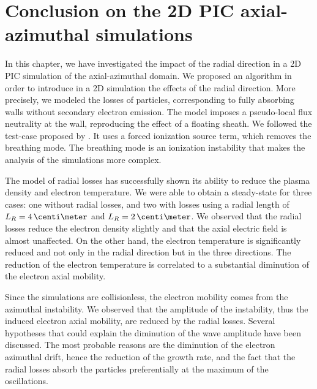 


\section{Conclusion on the 2D PIC axial-azimuthal simulations}

In this chapter, we have investigated the impact of the radial direction in a \ac{2D} \ac{PIC} simulation of the axial-azimuthal domain.
We proposed an algorithm in order to introduce in a \ac{2D} \ztheta simulation the effects of the radial direction.
More precisely, we modeled the losses of particles, corresponding to fully absorbing walls without secondary electron emission.
The model imposes a pseudo-local flux neutrality at the wall, reproducing the effect of a floating sheath.
We followed the test-case proposed by \citet{boeuf2018}.
It uses a forced ionization source term, which removes the breathing mode.
The breathing mode is an ionization instability that makes the analysis of the simulations more complex.

The model of radial losses has successfully shown its ability to reduce the plasma density and electron temperature.
We were able to obtain a steady-state for three cases\string: one without radial losses, and two with losses using a radial length of $L_R=4\,\centi\meter$ and $L_R=2\,\centi\meter$.
We observed that the radial losses reduce the electron density slightly and that the axial electric field is almost unaffected.
On the other hand, the electron temperature is significantly reduced and not only in the radial direction but in the three directions.
The reduction of the electron temperature is correlated to a substantial diminution of the electron axial mobility.

Since the simulations are collisionless, the electron mobility comes from the azimuthal instability.
We observed that the amplitude of the instability, thus the induced electron axial mobility, are reduced by the radial losses.
Several hypotheses that could explain the diminution of the wave amplitude have been discussed.
The most probable reasons are the diminution of the electron azimuthal drift, hence the reduction of the growth rate, and the fact that the radial losses absorb the particles preferentially at the maximum of the oscillations.

